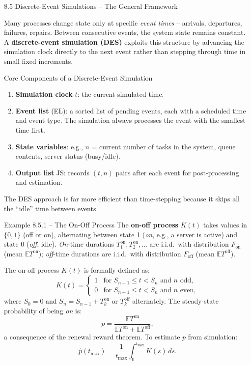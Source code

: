 \documentclass[aspectratio=169,10pt]{beamer}
\newcommand{\E}{\mathbb{E}}
\begin{document}
\begin{frame}[allowframebreaks]{8.5 Discrete-Event Simulations -- The General Framework}

Many processes change state only at specific \emph{event times} -- arrivals,
departures, failures, repairs.  Between consecutive events, the system state
remains constant.  A \textbf{discrete-event simulation (DES)} exploits this
structure by advancing the simulation clock directly to the next event rather
than stepping through time in small fixed increments.

\begin{block}{Core Components of a Discrete-Event Simulation}
\begin{enumerate}
  \item \textbf{Simulation clock} $t$: the current simulated time.
  \item \textbf{Event list} (EL): a sorted list of pending events, each with
        a scheduled time and event type.  The simulation always processes the
        event with the smallest time first.
  \item \textbf{State variables}: e.g., $n$ = current number of tasks in the
        system, queue contents, server status (busy/idle).
  \item \textbf{Output list} JS: records $(t, n)$ pairs after each event for
        post-processing and estimation.
\end{enumerate}
\end{block}

The DES approach is far more efficient than time-stepping because it skips all
the ``idle'' time between events.

\framebreak

\begin{block}{Example 8.5.1 -- The On-Off Process}
The \textbf{on-off process} $K(t)$ takes values in $\{0, 1\}$ (off or on),
alternating between state 1 (\emph{on}, e.g., a server is active) and state 0
(\emph{off}, idle).  \emph{On}-time durations $T_1^{\mathrm{on}}, T_2^{\mathrm{on}},
\ldots$ are i.i.d.\ with distribution $F_{\mathrm{on}}$ (mean $\E T^{\mathrm{on}}$);
\emph{off}-time durations are i.i.d.\ with distribution $F_{\mathrm{off}}$
(mean $\E T^{\mathrm{off}}$).

The on-off process $K(t)$ is formally defined as:
\[
  K(t) = \begin{cases} 1 & \text{for } S_{n-1} \le t < S_n \text{ and } n \text{ odd},\\
                       0 & \text{for } S_{n-1} \le t < S_n \text{ and } n \text{ even},
          \end{cases}
\]
where $S_0=0$ and $S_n = S_{n-1} + T_k^{\mathrm{on}}$ or $T_k^{\mathrm{off}}$
alternately.  The steady-state probability of being \emph{on} is:
\[
  p = \frac{\E T^{\mathrm{on}}}{\E T^{\mathrm{on}} + \E T^{\mathrm{off}}},
\]
a consequence of the renewal reward theorem.  To estimate $p$ from simulation:
\[
  \hat{p}(t_{\max}) = \frac{1}{t_{\max}}\int_0^{t_{\max}} K(s)\,ds.
\]
\end{block}


\end{frame}
\end{document}
